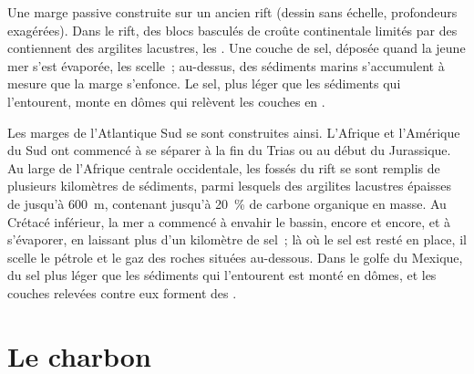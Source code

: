 \begin{omfigure}

{\small Une marge passive construite sur un ancien rift (dessin sans
échelle, profondeurs exagérées). Dans le rift, des blocs basculés de croûte
continentale limités par des  contiennent des argilites
lacustres, les . Une couche de sel, déposée quand la jeune mer
s'est évaporée, les scelle~; au-dessus, des sédiments marins s'accumulent à
mesure que la marge s'enfonce. Le sel, plus léger que les sédiments qui
l'entourent, monte en dômes qui relèvent les couches en .}
\end{omfigure}

Les marges de l'Atlantique Sud se sont construites ainsi. L'Afrique et
l'Amérique du Sud ont commencé à se séparer à la fin du Trias ou au début
du Jurassique. Au large de l'Afrique centrale occidentale, les fossés du
rift se sont remplis de plusieurs kilomètres de sédiments, parmi lesquels
des argilites lacustres épaisses de jusqu'à \qty{600}{m}, contenant jusqu'à
\qty{20}{\percent} de carbone organique en masse. Au Crétacé inférieur, la
mer a commencé à envahir le bassin, encore et encore, et à s'évaporer, en
laissant plus d'un kilomètre de sel~; là où le sel est resté en place, il
scelle le pétrole et le gaz des roches situées au-dessous. Dans le golfe du
Mexique, du sel plus léger que les sédiments qui l'entourent est monté en
dômes, et les couches relevées contre eux forment des .

\section{Le charbon}


